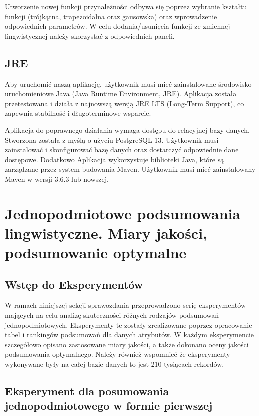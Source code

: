 \documentclass{article}
\begin{document}
\noindent Utworzenie nowej funkcji przynależności odbywa się poprzez wybranie kształtu funkcji (trójkątna, trapezoidalna oraz gausowska) oraz wprowadzenie odpowiednich parametrów. W celu dodania/usunięcia funkcji ze zmiennej lingwistycznej należy skorzystać z odpowiednich paneli.


\subsection{JRE}

\noindent Aby uruchomić naszą aplikację, użytkownik musi mieć zainstalowane środowisko uruchomieniowe Java (Java Runtime Environment, JRE). Aplikacja została przetestowana i działa z najnowszą wersją JRE LTS (Long-Term Support), co zapewnia stabilność i długoterminowe wsparcie.

\noindent Aplikacja do poprawnego działania wymaga dostępu do relacyjnej bazy danych. Stworzona została z myślą o użyciu PostgreSQL 13. Użytkownik musi zainstalować i skonfigurować bazę danych oraz dostarczyć odpowiednie dane dostępowe. Dodatkowo Aplikacja wykorzystuje biblioteki Java, które są zarządzane przez system budowania Maven. Użytkownik musi mieć zainstalowany Maven w wersji 3.6.3 lub nowszej.


\section{ Jednopodmiotowe podsumowania lingwistyczne. Miary jakości, podsumowanie optymalne}

\subsection{Wstęp do Eksperymentów}

W ramach niniejszej sekcji sprawozdania przeprowadzono serię eksperymentów mających na celu analizę skuteczności różnych rodzajów podsumowań jednopodmiotowych. Eksperymenty te zostały zrealizowane poprzez opracowanie tabel i rankingów podsumowań dla danych atrybutów. W każdym eksperymencie szczegółowo opisano zastosowane miary jakości, a także dokonano oceny jakości podsumowania optymalnego. Należy również wspomnieć że eksperymenty wykonywane były na całej bazie danych to jest 210 tysiącach rekordów.

\subsection{Eksperyment dla posumowania jednopodmiotowego w formie pierwszej}
\end{document}
